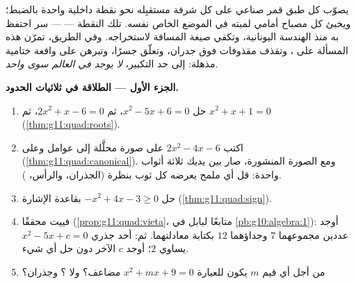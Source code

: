 \begin{problem}
\label{pb:g11:quad:1}
يصوّب كل طبق قمر صناعي على كل شرفة مستقبِله نحو نقطة
داخلية واحدة بالضبط؛ ويخبئ كل مصباح أمامي لمبته في
الموضع الخاص نفسه. تلك النقطة --- \emph{} --- سر
احتفظ به  منذ الهندسة اليونانية، وتكفي
صيغة المسافة لاستخراجه. وفي الطريق، تمرّن هذه
المسألة على ، وتقذف مقذوفات فوق جدران،
وتعلّق جسرًا، وتبرهن على واقعة ختامية مذهلة: إلى
حد التكبير، \emph{لا يوجد في العالم سوى  واحد}.

\medskip
\noindent\textbf{الجزء الأول --- الطلاقة في ثلاثيات الحدود.}
\begin{enumerate}
  \item حل $x^2 - 5x + 6 = 0$، ثم $2x^2 + x - 6 = 0$، ثم
        $x^2 + x + 1 = 0$ (\cref{thm:g11:quad:roots}).
  \item اكتب $2x^2 - 4x - 6$ على صورة محلَّلة إلى عوامل وعلى  (\cref{thm:g11:quad:canonical}). ومع الصورة
        المنشورة، صار بين يديك ثلاثة أثواب 
        واحدة: قل أي ملمح يعرضه كل ثوب بنظرة
        (الجذران، والرأس، ).
  \item حل $-x^2 + 4x - 3 \geq 0$ بقاعدة الإشارة
        (\cref{thm:g11:quad:sign}).
  \item فييت محققًا (\cref{prop:g11:quad:vieta}،
        متابعًا لبابل في \cref{pb:g10:algebra:1}): أوجد عددين
        مجموعهما $7$ وجداؤهما $12$ بكتابة
        معادلتهما. ثم: أحد جذري $x^2 - 5x + c = 0$ يساوي
        $2$؛ أوجد $c$  الآخر دون حل أي
        شيء.
  \item من أجل أي قيم $m$ يكون للعبارة $x^2 + mx + 9 = 0$ 
        مضاعف؟ ولا ؟ وجذران؟
\end{enumerate}


\end{problem}
